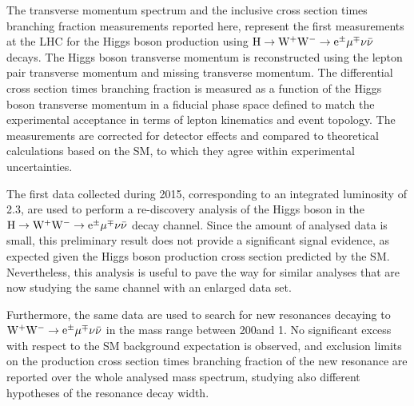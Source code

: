 The transverse momentum spectrum and the inclusive cross section times branching fraction measurements reported here, represent the first measurements at the LHC for the Higgs boson production using $\rm{H}\to\rm{W^+W^-}\to e^{\pm} \mu^{\mp}\nu\bar{\nu}$ decays.
The Higgs boson transverse momentum is reconstructed using the lepton pair transverse momentum and missing transverse momentum. The differential cross section times branching fraction is measured as a function of the Higgs boson transverse momentum in a fiducial phase space defined to match the experimental acceptance in terms of lepton kinematics and event topology. The measurements are corrected for detector effects and compared to theoretical calculations based on the SM, to which they agree within experimental uncertainties.

The first data collected during 2015, corresponding to an integrated luminosity of 2.3\ifb, are used to perform a re-discovery analysis of the Higgs boson in the $\rm{H}\to\rm{W^+W^-}\to e^{\pm} \mu^{\mp}\nu\bar{\nu}$ decay channel. Since the amount of analysed data is small, this preliminary result does not provide a significant signal evidence, as expected given the Higgs boson production cross section predicted by the SM. Nevertheless, this analysis is useful to pave the way for similar analyses that are now studying the same channel with an enlarged data set.

Furthermore, the same data are used to search for new resonances decaying to $\rm{W^+W^-}\to e^{\pm} \mu^{\mp}\nu\bar{\nu}$ in the mass range between 200\GeV and 1\TeV. No significant excess with respect to the SM background expectation is observed, and exclusion limits on the production cross section times branching fraction of the new resonance are reported over the whole analysed mass spectrum, studying also different hypotheses of the resonance decay width.
